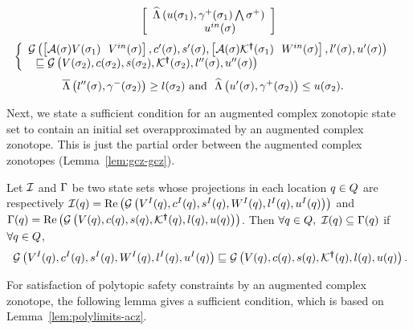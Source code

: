 \begin{lemma}
\begin{enumerate}
\begin{align}
  \left[\begin{array}{c}{\widehat{\Lambda}\left(u(\sigma_{1}),\gamma^+(\sigma_{1})\bigwedge\sigma^+\right)}\\{~~~~~~~~~u^{in}(\sigma)~~~} \end{array}\right]
\end{align}
\vspace{-1.5em}
\begin{align}
& \left\{\begin{array}{l}{\mathcal{G}\left(\left[\mathcal{A}(\sigma)V(\sigma_{1})~~V^{in}(\sigma)\right],c^\prime(\sigma),s^\prime(\sigma),\left[\mathcal{A}(\sigma)\mathcal{K}^{\bm{\dagger}}(\sigma_{1})~~W^{in}(\sigma)\right],l^\prime(\sigma),u^\prime(\sigma)\right)}\\{~~\sqsubseteq
   \mathcal{G}\left(V(\sigma_{2}),c(\sigma_{2}),s(\sigma_{2}),\mathcal{K}^{\bm{\dagger}}(\sigma_{2}),l^{\prime\prime}(\sigma),u^{\prime\prime}(\sigma)\right)} \end{array}\right.
\end{align}
\vspace{-1.5em}
\begin{align}
& \overline{\Lambda}\left(l^{\prime\prime}(\sigma),\gamma^-(\sigma_{2})\right)\geq l(\sigma_{2})~\text{and}~~
\widehat{\Lambda}\left(u^\prime(\sigma),\gamma^+(\sigma_{2})\right)\leq u(\sigma_{2}).
\end{align}
\vspace{-1.5em}
\end{enumerate}
\end{lemma}
%
Next, we state a sufficient condition for an augmented complex
zonotopic state set to contain an initial set overapproximated by an
augmented complex zonotope.  This is just the partial order between
the augmented complex zonotopes (Lemma~\ref{lem:gcz-gcz}).
\begin{lemma}
  Let $\mathcal{I}$ and $\Gamma$ be two state sets whose projections in
  each location $q\in Q$ are respectively
  $\mathcal{I}(q)=\operatorname{\operatorname{Re}}\left(\mathcal{G}\left(V^I(q),c^I(q),s^I(q),W^I(q),l^I(q),u^I(q)\right)\right)$
  and $\Gamma(q) =
  \operatorname{\operatorname{Re}}\left(\mathcal{G}\left(V(q),c(q),s(q),\mathcal{K}^{\bm{\dagger}}(q),l(q),u(q)\right)\right)$.
  Then $\forall q\in Q,~\mathcal{I}(q)\subseteq
  \Gamma(q)$ if $\forall q\in Q$,
\begin{align}~\label{eqn:initcont}
\mathcal{G}\left(V^I(q),c^I(q),s^I(q),W^I(q),l^I(q),u^I(q)\right)\sqsubseteq\mathcal{G}\left(V(q),c(q),s(q),\mathcal{K}^{\bm{\dagger}}(q),l(q),u(q)\right).
\end{align}
\end{lemma}
%
For satisfaction of polytopic safety constraints by an augmented
complex zonotope, the following lemma gives a sufficient condition,
which is based on Lemma~\ref{lem:polylimits-acz}.
%
